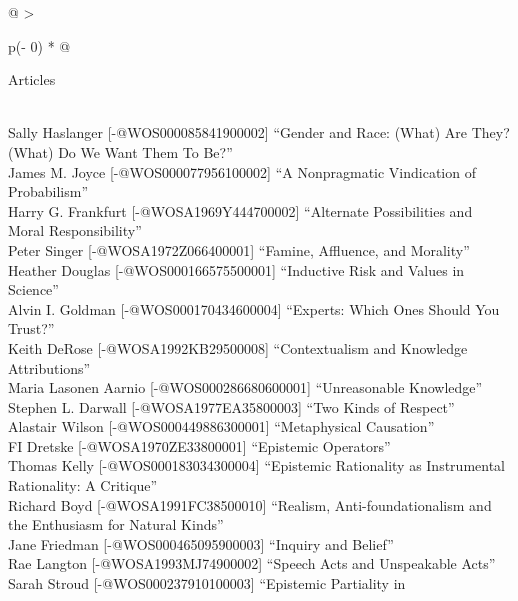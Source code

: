 \documentclass[
  10pt,
  letterpaper,
  DIV=11,
  numbers=noendperiod,
  twoside]{scrartcl}
\begin{document}
\begin{longtable}[]{@{}
  >{\raggedright\arraybackslash}p{(\columnwidth - 0\tabcolsep) * }@{}}

\caption{\label{tbl-late-bloomers}Most cited articles since 2020 not on
any of the earlier lists}

\tabularnewline

\toprule\noalign{}
\begin{minipage}[b]{\linewidth}\raggedright
Articles
\end{minipage} \\
\midrule\noalign{}
\endhead
\bottomrule\noalign{}
\endlastfoot
Sally Haslanger {[}-@WOS000085841900002{]} ``Gender and Race: (What) Are
They? (What) Do We Want Them To Be?'' \\
James M. Joyce {[}-@WOS000077956100002{]} ``A Nonpragmatic Vindication
of Probabilism'' \\
Harry G. Frankfurt {[}-@WOSA1969Y444700002{]} ``Alternate Possibilities
and Moral Responsibility'' \\
Peter Singer {[}-@WOSA1972Z066400001{]} ``Famine, Affluence, and
Morality'' \\
Heather Douglas {[}-@WOS000166575500001{]} ``Inductive Risk and Values
in Science'' \\
Alvin I. Goldman {[}-@WOS000170434600004{]} ``Experts: Which Ones Should
You Trust?'' \\
Keith DeRose {[}-@WOSA1992KB29500008{]} ``Contextualism and Knowledge
Attributions'' \\
Maria Lasonen Aarnio {[}-@WOS000286680600001{]} ``Unreasonable
Knowledge'' \\
Stephen L. Darwall {[}-@WOSA1977EA35800003{]} ``Two Kinds of
Respect'' \\
Alastair Wilson {[}-@WOS000449886300001{]} ``Metaphysical Causation'' \\
FI Dretske {[}-@WOSA1970ZE33800001{]} ``Epistemic Operators'' \\
Thomas Kelly {[}-@WOS000183034300004{]} ``Epistemic Rationality as
Instrumental Rationality: A Critique'' \\
Richard Boyd {[}-@WOSA1991FC38500010{]} ``Realism, Anti-foundationalism
and the Enthusiasm for Natural Kinds'' \\
Jane Friedman {[}-@WOS000465095900003{]} ``Inquiry and Belief'' \\
Rae Langton {[}-@WOSA1993MJ74900002{]} ``Speech Acts and Unspeakable
Acts'' \\
Sarah Stroud {[}-@WOS000237910100003{]} ``Epistemic Partiality in

\end{longtable}
\end{document}
